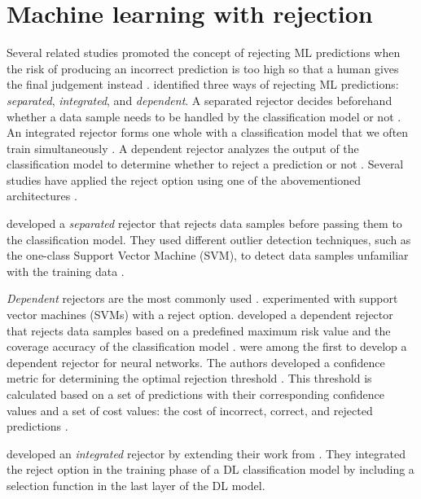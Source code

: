 \section{Machine learning with rejection}
\label{sec:related-work-rejection}
Several related studies promoted the concept of rejecting ML predictions when the risk of producing an incorrect prediction is too high so that a human gives the final judgement instead \citep{sayin2021science, hendrickx2021machine, woo2020future}.
%
\citet{hendrickx2021machine} identified three ways of rejecting ML predictions: \emph{separated}, \emph{integrated}, and \emph{dependent}.
%
A separated rejector decides beforehand whether a data sample needs to be handled by the classification model or not \citep{hendrickx2021machine}.
%
An integrated rejector forms one whole with a classification model that we often train simultaneously \citep{hendrickx2021machine}.
%
A dependent rejector analyzes the output of the classification model to determine whether to reject a prediction or not \citep{hendrickx2021machine}.
%
Several studies have applied the reject option using one of the abovementioned architectures \citep{coenen2020probability, grandvalet2008reject, Geifman2017Selective, geifman2019reject, de2000reject}.
%

%
\citet{coenen2020probability} developed a \emph{separated} rejector that rejects data samples before passing them to the classification model.
%
They used different outlier detection techniques, such as the one-class Support Vector Machine (SVM), to detect data samples unfamiliar with the training data \citep{coenen2020probability}.
%

%
\emph{Dependent} rejectors are the most commonly used \citep{Geifman2017Selective, de2000reject, grandvalet2008reject}.
%
\citet{grandvalet2008reject} experimented with support vector machines (SVMs) with a reject option.
%
\citet{Geifman2017Selective} developed a dependent rejector that rejects data samples based on a predefined maximum risk value and the coverage accuracy of the classification model \citep{Geifman2017Selective}.
%
\citet{de2000reject} were among the first to develop a dependent rejector for neural networks.
%
The authors developed a confidence metric for determining the optimal rejection threshold \citep{de2000reject}.
%
This threshold is calculated based on a set of predictions with their corresponding confidence values and a set of cost values: the cost of incorrect, correct, and rejected predictions \citep{de2000reject}.
%

%
\citet{geifman2019reject} developed an \emph{integrated} rejector by extending their work from \citet{Geifman2017Selective}.
%
They integrated the reject option in the training phase of a DL classification model by including a selection function in the last layer of the DL model.
%

